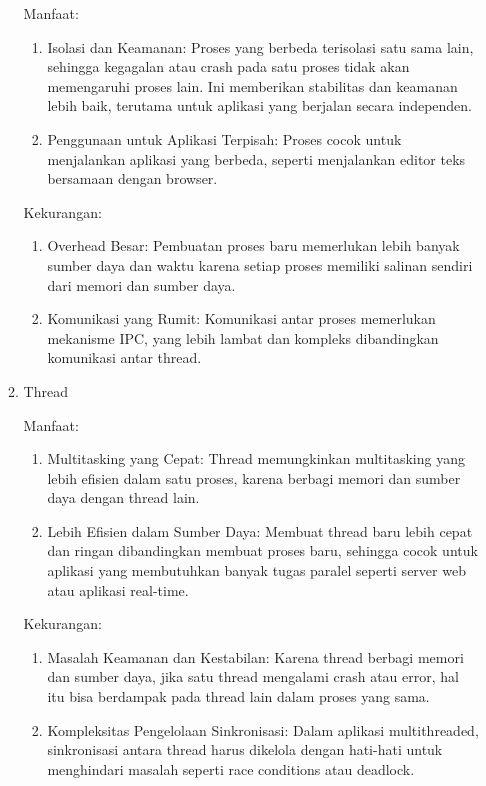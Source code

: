 \documentclass[12pt]{article}
\begin{document}
\begin{enumerate}
\begin{enumerate}
		            Manfaat:
		            \begin{enumerate}
			            \item Isolasi dan Keamanan: Proses yang berbeda terisolasi satu sama lain, sehingga kegagalan atau crash pada satu proses tidak akan memengaruhi proses lain. Ini memberikan stabilitas dan keamanan lebih baik, terutama untuk aplikasi yang berjalan secara independen.
			            \item Penggunaan untuk Aplikasi Terpisah: Proses cocok untuk menjalankan aplikasi yang berbeda, seperti menjalankan editor teks bersamaan dengan browser.
		            \end{enumerate}
		            Kekurangan:
		            \begin{enumerate}
			            \item Overhead Besar: Pembuatan proses baru memerlukan lebih banyak sumber daya dan waktu karena setiap proses memiliki salinan sendiri dari memori dan sumber daya.
			            \item Komunikasi yang Rumit: Komunikasi antar proses memerlukan mekanisme IPC, yang lebih lambat dan kompleks dibandingkan komunikasi antar thread.
		            \end{enumerate}
		      \item Thread

		            Manfaat:
		            \begin{enumerate}
			            \item Multitasking yang Cepat: Thread memungkinkan multitasking yang lebih efisien dalam satu proses, karena berbagi memori dan sumber daya dengan thread lain.
			            \item Lebih Efisien dalam Sumber Daya: Membuat thread baru lebih cepat dan ringan dibandingkan membuat proses baru, sehingga cocok untuk aplikasi yang membutuhkan banyak tugas paralel seperti server web atau aplikasi real-time.

		            \end{enumerate}

		            Kekurangan:
		            \begin{enumerate}
			            \item Masalah Keamanan dan Kestabilan: Karena thread berbagi memori dan sumber daya, jika satu thread mengalami crash atau error, hal itu bisa berdampak pada thread lain dalam proses yang sama.
			            \item Kompleksitas Pengelolaan Sinkronisasi: Dalam aplikasi multithreaded, sinkronisasi antara thread harus dikelola dengan hati-hati untuk menghindari masalah seperti race conditions atau deadlock.


\end{enumerate}
\end{enumerate}
\end{enumerate}
\end{document}
